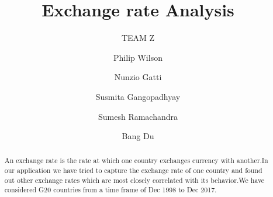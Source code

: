 \documentclass[sigconf]{acmart}
\begin{document}
\title{Exchange rate Analysis} 

 \subtitle{TEAM Z}


\author{Philip Wilson}

\author{Nunzio Gatti}

\author{Susmita Gangopadhyay} 

\author{Sumesh Ramachandra}

\author{Bang Du}



\begin{abstract}
An exchange rate is the rate at which one country exchanges currency with another.In our application we have tried to capture the exchange rate of one country and found out other exchange rates which are most closely correlated with its behavior.We have considered G20 countries from a time frame of Dec 1998 to Dec 2017.
\end{abstract}










\maketitle



\end{document}
